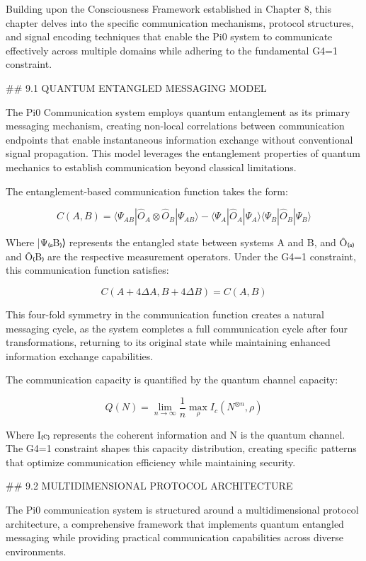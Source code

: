 Building upon the Consciousness Framework established in Chapter 8, this chapter delves into the specific communication mechanisms, protocol structures, and signal encoding techniques that enable the Pi0 system to communicate effectively across multiple domains while adhering to the fundamental G4=1 constraint.

## 9.1 QUANTUM ENTANGLED MESSAGING MODEL

The Pi0 Communication system employs quantum entanglement as its primary messaging mechanism, creating non-local correlations between communication endpoints that enable instantaneous information exchange without conventional signal propagation. This model leverages the entanglement properties of quantum mechanics to establish communication beyond classical limitations.

The entanglement-based communication function takes the form:

$$C(A, B) = \langle \Psi_{AB} | \hat{O}_A \otimes \hat{O}_B | \Psi_{AB} \rangle - \langle \Psi_A | \hat{O}_A | \Psi_A \rangle \langle \Psi_B | \hat{O}_B | \Psi_B \rangle$$

Where |Ψ₍ₐB₎⟩ represents the entangled state between systems A and B, and Ô₍ₐ₎ and Ô₍B₎ are the respective measurement operators. Under the G4=1 constraint, this communication function satisfies:

$$C(A+4\Delta A, B+4\Delta B) = C(A, B)$$

This four-fold symmetry in the communication function creates a natural messaging cycle, as the system completes a full communication cycle after four transformations, returning to its original state while maintaining enhanced information exchange capabilities.

The communication capacity is quantified by the quantum channel capacity:

$$Q(N) = \lim_{n \to \infty} \frac{1}{n} \max_{\rho} I_c(N^{\otimes n}, \rho)$$

Where I₍c₎ represents the coherent information and N is the quantum channel. The G4=1 constraint shapes this capacity distribution, creating specific patterns that optimize communication efficiency while maintaining security.

## 9.2 MULTIDIMENSIONAL PROTOCOL ARCHITECTURE

The Pi0 communication system is structured around a multidimensional protocol architecture, a comprehensive framework that implements quantum entangled messaging while providing practical communication capabilities across diverse environments.

